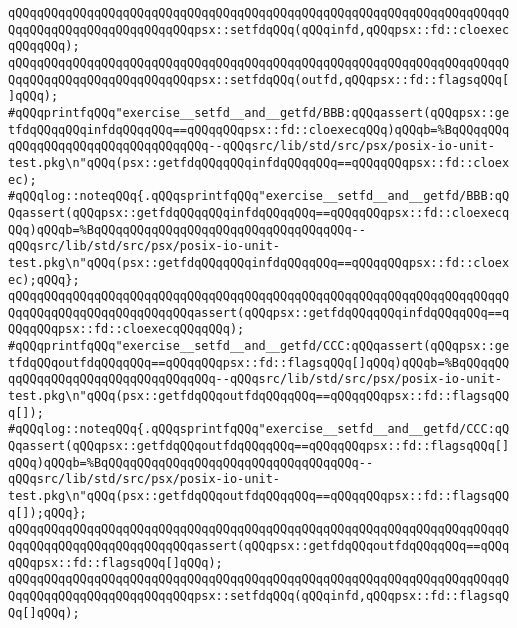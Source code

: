 \newline
\verb|qQQqqQQqqQQqqQQqqQQqqQQqqQQqqQQqqQQqqQQqqQQqqQQqqQQqqQQqqQQqqQQqqQQqqQQqqQQqqQQqqQQqqQQqqQQqqQQqpsx::setfdqQQq(qQQqinfd,qQQqpsx::fd::cloexecqQQqqQQq);|\newline
\verb|qQQqqQQqqQQqqQQqqQQqqQQqqQQqqQQqqQQqqQQqqQQqqQQqqQQqqQQqqQQqqQQqqQQqqQQqqQQqqQQqqQQqqQQqqQQqqQQqpsx::setfdqQQq(outfd,qQQqpsx::fd::flagsqQQq[]qQQq);|\newline
\newline
\verb|#qQQqprintfqQQq"exercise__setfd__and__getfd/BBB:qQQqassert(qQQqpsx::getfdqQQqqQQqinfdqQQqqQQq==qQQqqQQqpsx::fd::cloexecqQQq)qQQqb=%BqQQqqQQqqQQqqQQqqQQqqQQqqQQqqQQqqQQq--qQQqsrc/lib/std/src/psx/posix-io-unit-test.pkg\n"qQQq(psx::getfdqQQqqQQqinfdqQQqqQQq==qQQqqQQqpsx::fd::cloexec);|\newline
\verb|#qQQqlog::noteqQQq{.qQQqsprintfqQQq"exercise__setfd__and__getfd/BBB:qQQqassert(qQQqpsx::getfdqQQqqQQqinfdqQQqqQQq==qQQqqQQqpsx::fd::cloexecqQQq)qQQqb=%BqQQqqQQqqQQqqQQqqQQqqQQqqQQqqQQqqQQq--qQQqsrc/lib/std/src/psx/posix-io-unit-test.pkg\n"qQQq(psx::getfdqQQqqQQqinfdqQQqqQQq==qQQqqQQqpsx::fd::cloexec);qQQq};|\newline
\verb|qQQqqQQqqQQqqQQqqQQqqQQqqQQqqQQqqQQqqQQqqQQqqQQqqQQqqQQqqQQqqQQqqQQqqQQqqQQqqQQqqQQqqQQqqQQqqQQqassert(qQQqpsx::getfdqQQqqQQqinfdqQQqqQQq==qQQqqQQqpsx::fd::cloexecqQQqqQQq);|\newline
\verb|#qQQqprintfqQQq"exercise__setfd__and__getfd/CCC:qQQqassert(qQQqpsx::getfdqQQqoutfdqQQqqQQq==qQQqqQQqpsx::fd::flagsqQQq[]qQQq)qQQqb=%BqQQqqQQqqQQqqQQqqQQqqQQqqQQqqQQqqQQq--qQQqsrc/lib/std/src/psx/posix-io-unit-test.pkg\n"qQQq(psx::getfdqQQqoutfdqQQqqQQq==qQQqqQQqpsx::fd::flagsqQQq[]);|\newline
\verb|#qQQqlog::noteqQQq{.qQQqsprintfqQQq"exercise__setfd__and__getfd/CCC:qQQqassert(qQQqpsx::getfdqQQqoutfdqQQqqQQq==qQQqqQQqpsx::fd::flagsqQQq[]qQQq)qQQqb=%BqQQqqQQqqQQqqQQqqQQqqQQqqQQqqQQqqQQq--qQQqsrc/lib/std/src/psx/posix-io-unit-test.pkg\n"qQQq(psx::getfdqQQqoutfdqQQqqQQq==qQQqqQQqpsx::fd::flagsqQQq[]);qQQq};|\newline
\verb|qQQqqQQqqQQqqQQqqQQqqQQqqQQqqQQqqQQqqQQqqQQqqQQqqQQqqQQqqQQqqQQqqQQqqQQqqQQqqQQqqQQqqQQqqQQqqQQqassert(qQQqpsx::getfdqQQqoutfdqQQqqQQq==qQQqqQQqpsx::fd::flagsqQQq[]qQQq);|\newline
\newline
\newline
\verb|qQQqqQQqqQQqqQQqqQQqqQQqqQQqqQQqqQQqqQQqqQQqqQQqqQQqqQQqqQQqqQQqqQQqqQQqqQQqqQQqqQQqqQQqqQQqqQQqpsx::setfdqQQq(qQQqinfd,qQQqpsx::fd::flagsqQQq[]qQQq);|\newline
